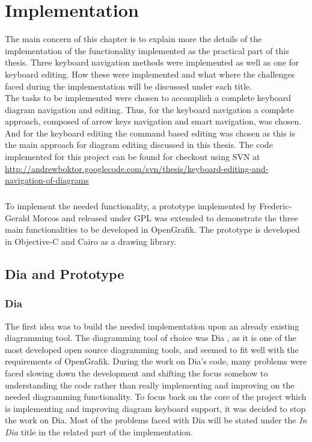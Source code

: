 \chapter{Implementation}
\beginchapter
The main concern of this chapter is to explain more the details of the implementation of the functionality implemented as the practical part of this thesis. Three keyboard navigation methods were implemented as well as one for keyboard editing. How these were implemented and what where the challenges faced during the implementation will be discussed under each title.\\
The tasks to be implemented were chosen to accomplish a complete keyboard diagram navigation and editing. Thus, for the keyboard navigation a complete approach, composed of arrow keys navigation and smart navigation, was chosen. And for the keyboard editing the command based editing was chosen as this is the main approach for diagram editing discussed in this thesis.
The code implemented for this project can be found for checkout using SVN at \url{http://andrewboktor.googlecode.com/svn/thesis/keyboard-editing-and-navigation-of-diagrams}

\paragraph{}
To implement the needed functionality, a prototype implemented by Frederic-Gerald Morcos and released under GPL \cite{gpl} was extended to demonstrate the three main functionalities to be developed in OpenGrafik. The prototype is developed in Objective-C and Cairo as a drawing library.

\section{Dia and Prototype}
\subsection{Dia}
The first idea was to build the needed implementation upon an already existing diagramming tool. The diagramming tool of choice was Dia \cite{dia}, as it is one of the most developed open source diagramming tools, and seemed to fit well with the requirements of OpenGrafik. During the work on Dia's code, many problems were faced slowing down the development and shifting the focus somehow to understanding the code rather than really implementing and improving on the needed diagramming functionality. To focus back on the core of the project which is implementing and improving diagram keyboard support, it was decided to stop the work on Dia. Most of the problems faced with Dia will be stated under the {\it In Dia} title in the related part of the implementation.

